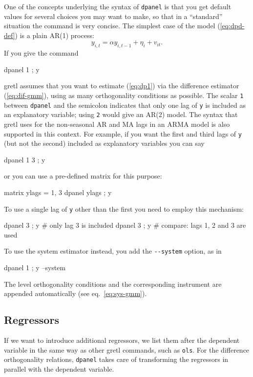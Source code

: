 One of the concepts underlying the syntax of \texttt{dpanel} is that
you get default values for several choices you may want to make, so
that in a ``standard'' situation the command is very concise.  The
simplest case of the model (\ref{eq:dpd-def}) is a plain AR(1)
process:
\begin{equation}
\label{eq:dp1}
  y_{i,t} = \alpha y_{i,t-1} + \eta_{i} + v_{it} .
\end{equation}
If you give the command
\begin{code}
  dpanel 1 ; y
\end{code}
gretl assumes that you want to estimate (\ref{eq:dp1}) via the
difference estimator (\ref{eq:dif-gmm}), using as many orthogonality
conditions as possible.  The scalar \texttt{1} between \texttt{dpanel}
and the semicolon indicates that only one lag of \texttt{y} is
included as an explanatory variable; using \texttt{2} would give an
AR(2) model. The syntax that gretl uses for the non-seasonal AR and MA
lags in an ARMA model is also supported in this context. For
example, if you want the first and third lags of \texttt{y} (but not
the second) included as explanatory variables you can say
\begin{code}
  dpanel {1 3} ; y
\end{code}
or you can use a pre-defined matrix for this purpose:
\begin{code}
  matrix ylags = {1, 3}
  dpanel ylags ; y
\end{code}
To use a single lag of \texttt{y} other than the first you need to
employ this mechanism:
\begin{code}
  dpanel {3} ; y # only lag 3 is included
  dpanel 3 ; y   # compare: lags 1, 2 and 3 are used
\end{code}

To use the system estimator instead, you add the \verb|--system|
option, as in
\begin{code}
  dpanel 1 ; y --system
\end{code}
The level orthogonality conditions and the corresponding instrument
are appended automatically (see eq.\ \ref{eq:sys-gmm}).

\subsection{Regressors}

If we want to introduce additional regressors, we list them after the
dependent variable in the same way as other gretl commands, such as
\texttt{ols}.  For the difference orthogonality relations,
\texttt{dpanel} takes care of transforming the regressors in parallel
with the dependent variable.


